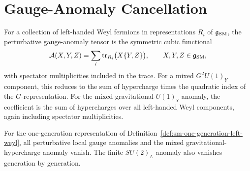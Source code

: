 \section{Gauge-Anomaly Cancellation}

\begin{definition}
\label{def:sm-local-anomaly-coefficients}
For a collection of left-handed Weyl fermions in representations \(R_i\) of
\(\mathfrak g_{\rm SM}\), the perturbative gauge-anomaly tensor is the
symmetric cubic functional
\[
  \mathcal A(X,Y,Z)
  =
  \sum_i \operatorname{tr}_{R_i}\bigl(X\{Y,Z\}\bigr),
  \qquad
  X,Y,Z\in\mathfrak g_{\rm SM},
\]
with spectator multiplicities included in the trace.  For a mixed
\(G^2U(1)_Y\) component, this reduces to the sum of hypercharge times the
quadratic index of the \(G\)-representation.  For the mixed
gravitational-\(U(1)_Y\) anomaly, the coefficient is the sum of hypercharges
over all left-handed Weyl components, again including spectator
multiplicities.
\end{definition}

\begin{proposition}
\label{prop:sm-generation-anomaly-cancellation}
For the one-generation representation of
Definition~\ref{def:sm-one-generation-left-weyl}, all perturbative local
gauge anomalies and the mixed gravitational-hypercharge anomaly vanish.  The
finite \(SU(2)_L\) anomaly also vanishes generation by generation.
\end{proposition}

